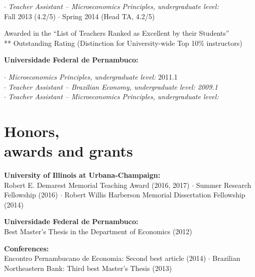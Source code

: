 \documentclass[mm, 10pt]{simple_style}
\begin{document}
\begin{resume}
$\cdot$ \textit{Teacher Assistant -- Microeconomics Principles, undergraduate level:} \\
\indent \hspace{1cm}  Fall 2013 (4.2/5) $\cdot$ Spring 2014 (Head TA, 4.2/5)

{\small * Awarded in the ``List of Teachers Ranked as Excellent by their Students'' \\
** Outstanding Rating (Distinction for University-wide Top 10\% instructors)}

\textbf{Universidade Federal de Pernambuco:}

$\cdot$ \textit{Microeconomics Principles, undergraduate level:} 2011.1\\
$\cdot$ \textit{Teacher Assistant -- Brazilian Economy, undergraduate level: 2009.1}\\
$\cdot$ \textit{Teacher Assistant -- Microeconomics Principles, undergraduate level:}

\section{Honors,\\ awards and grants}

\textbf{University of Illinois at Urbana-Champaign:} \\
Robert E. Demarest Memorial Teaching Award (2016, 2017) 
$\cdot$ Summer Research Fellowship (2016)
$\cdot$ Robert Willis Harberson Memorial Dissertation Fellowship (2014)

\textbf{Universidade Federal de Pernambuco:} \\
Best Master’s Thesis in the Department of Economics (2012)

\textbf{Conferences:}\\
Encontro Pernambucano de Economia: Second best article (2014)
$\cdot$ Brazilian Northeastern Bank: Third best Master’s Thesis (2013)





\end{resume}
\end{document}
